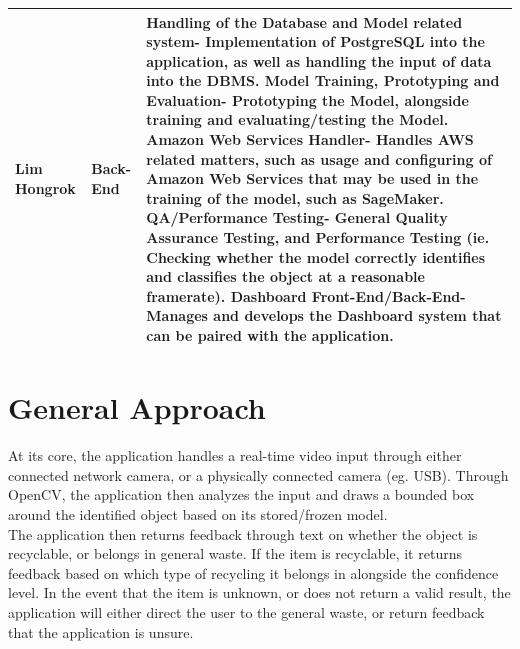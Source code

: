\documentclass[conference]{IEEEtran}
\begin{document}
\begin{table}[!htbp]
\begin{tabular}{|p{1.5cm}|p{1.5cm}|p{4.7cm}|}
Lim Hongrok & Back-End & 
\newline Handling of the Database and Model related system\newline- Implementation of PostgreSQL into the application, as well as handling the input of data into the DBMS.
\newline 
\newline Model Training, Prototyping and Evaluation\newline- Prototyping the Model, alongside training and evaluating/testing the Model.
\newline 
\newline Amazon Web Services Handler\newline- Handles AWS related matters, such as usage and configuring of Amazon Web Services that may be used in the training of the model, such as SageMaker.
\newline 
\newline QA/Performance Testing\newline- General Quality Assurance Testing, and Performance Testing (ie. Checking whether the model correctly identifies and classifies the object at a reasonable
framerate).
\newline 
\newline Dashboard Front-End/Back-End\newline- Manages and develops the Dashboard system that can be paired with the application. 
\\ \hline
\end{tabular}
\end{table}

\newpage

\section{General Approach}
At its core, the application handles a real-time video input through either connected network camera, or a physically connected camera (eg. USB). Through OpenCV, the application then analyzes the input and draws a bounded box around the identified object based on its stored/frozen model.\\

The application then returns feedback through text on whether the object is recyclable, or belongs in general waste. If the item is recyclable, it returns feedback based on which type of recycling it belongs in alongside the confidence level. In the event that the item is unknown, or does not return a valid result, the application will either direct the user to the general waste, or return feedback that the application is unsure.\\
\end{document}

